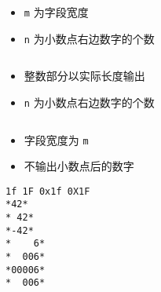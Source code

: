 \begin{frame}[fragile]
\begin{lstlisting}[backgroundcolor=\color{red!20}]
%m.nf     %m.ne      %m.nE
\end{lstlisting}

\begin{itemize}
\item \lstinline|m| 为字段宽度
\item \lstinline|n| 为小数点右边数字的个数
\end{itemize}
\end{frame}

\begin{frame}[fragile]
\begin{lstlisting}[backgroundcolor=\color{red!20}] 
%.nf
\end{lstlisting}

\begin{itemize}
\item 整数部分以实际长度输出
\item \lstinline|n| 为小数点右边数字的个数
\end{itemize}
\end{frame}

\begin{frame}[fragile]
\begin{lstlisting}[backgroundcolor=\color{red!20}] 
%m.f
\end{lstlisting}

\begin{itemize}
\item 字段宽度为 \lstinline|m|
\item 不输出小数点后的数字
\end{itemize}
\end{frame}

%       

\begin{frame}[fragile]\ft{\secname}
\begin{lstlisting}[showspaces=true,backgroundcolor=\color{red!20}]
1f 1F 0x1f 0X1F
*42*
* 42*
*-42*
*    6*
*  006*
*00006*
*  006*
\end{lstlisting}
\end{frame}


